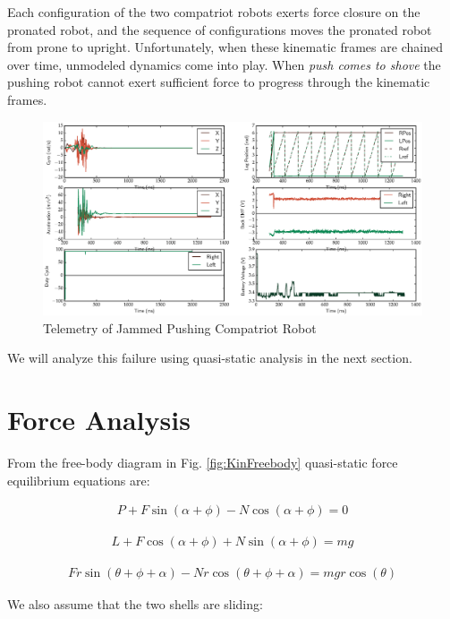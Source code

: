 \documentclass[letterpaper]{report}
\begin{document}
Each configuration of the two compatriot robots exerts force closure on the pronated robot, and the sequence of configurations moves the pronated robot from prone to upright.
Unfortunately, when these kinematic frames are chained over time, unmodeled dynamics come into play.
When \textit{push comes to shove} the pushing robot cannot exert sufficient force to progress through the kinematic frames.

\begin{figure}[ht]
  \centering
  \includegraphics[width=\textwidth]{JammedTelemetry.eps}
  \caption{\label{fig:JammedKinFlipTelemetry}Telemetry of Jammed Pushing Compatriot Robot}
\end{figure}

We will analyze this failure using quasi-static analysis in the next section.

\section{Force Analysis \label{sec:KinForces}}
From the free-body diagram in Fig. \ref{fig:KinFreebody} quasi-static force equilibrium equations are:

\begin{align}
  P + F \sin(\alpha + \phi) - N \cos(\alpha + \phi) = 0
  \label{eq:KinQSX}
\end{align}

\begin{align}
  L + F \cos(\alpha + \phi) + N \sin(\alpha + \phi) = mg
  \label{eq:KinQSY}
\end{align}

\begin{align}
  F r \sin(\theta + \phi + \alpha) - N r \cos(\theta + \phi + \alpha) = mg r \cos(\theta)
  \label{eq:KinTorque}
\end{align}

We also assume that the two shells are sliding:
\end{document}
